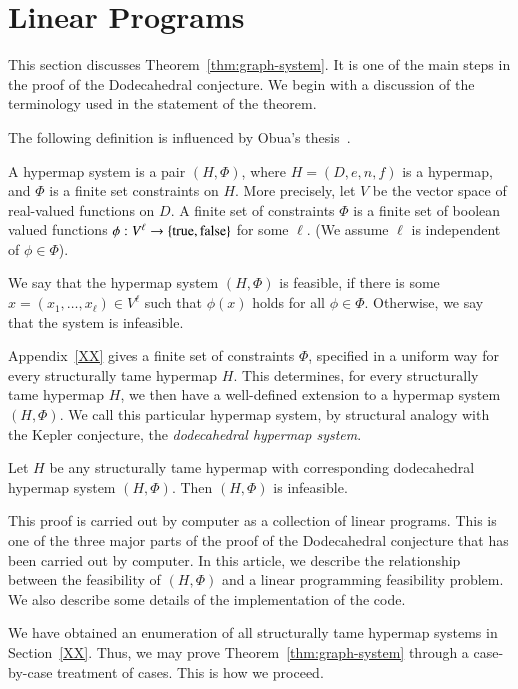 \section{Linear Programs}

This section discusses Theorem~\ref{thm:graph-system}.  It is one of
the main steps in the proof of the Dodecahedral conjecture.
We begin with a discussion of the terminology used in the
statement of the theorem.

The following definition is influenced by Obua's thesis~\cite{Ob}.

\begin{definition} A hypermap system is a pair $(H,\Phi)$,
where $H=(D,e,n,f)$ is a hypermap, and $\Phi$ is a finite set constraints on $H$.  More precisely, let $V$ be the vector space of
real-valued functions on $D$.  A finite set of constraints $\Phi$ is a finite
set of boolean valued functions $\phi:V^\ell\to \{{\operatorname{true}},{\operatorname{false}}\}$
for some $\ell$. (We assume $\ell$ is independent of $\phi\in \Phi$).
\end{definition}

We say that the hypermap system $(H,\Phi)$ is feasible, if
there is some $x=(x_1,\ldots,x_\ell)\in V^\ell$ such that
$\phi(x)$ holds for all $\phi\in\Phi$. Otherwise, we say that
the system is infeasible.

Appendix~\ref{XX} gives a finite set of constraints $\Phi$, 
specified
in a uniform way for every structurally tame hypermap $H$.  This determines,
for every structurally tame hypermap $H$, we then have a well-defined extension
to a hypermap system $(H,\Phi)$.  We call this particular hypermap
system, by structural analogy with the Kepler conjecture,
the {\it dodecahedral hypermap system}.  


\begin{theorem}\label{thm:graph-system}  Let 
$H$ be any structurally tame hypermap with corresponding
dodecahedral hypermap system $(H,\Phi)$.  Then $(H,\Phi)$ is infeasible.
\end{theorem}

This proof is carried out by computer as a collection of linear
programs.  This is one of the three major parts of the proof
of the Dodecahedral conjecture that has been carried out by computer.
In this article, we describe the relationship between the
feasibility of $(H,\Phi)$ and a linear programming feasibility
problem.  We also describe some details of the implementation of 
the code.

We have obtained an enumeration of all structurally tame
hypermap systems in Section~\ref{XX}.  Thus,  we may prove
Theorem~\ref{thm:graph-system} through a case-by-case treatment
of cases.  This is how we proceed.

